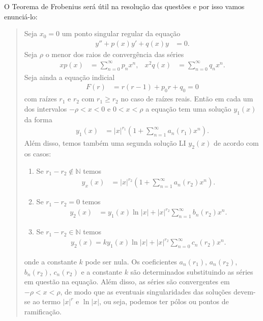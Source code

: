 \documentclass[a4paper,12pt, leqno, answers]{exam}
\begin{document}
\thispagestyle{empty}

\newpage
\setcounter{page}{1}
O Teorema de Frobenius ser\'{a} útil na resolu\c{c}\~{a}o das quest\~{o}es e por isso vamos enunci\'{a}-lo:
\begin{quote}
    Seja $x_0 = 0$ um ponto singular regular da equa\c{c}\~{a}o
    \begin{align*}
        y'' + p(x) y' + q(x) y &= 0.
    \end{align*}
    Seja $\rho$ o menor dos raios de converg\^{e}ncia das s\'{e}ries
    \begin{align*}
        x p(x) &= \sum_{n = 0}^\infty p_n x^n, & x^2 q(x) &= \sum_{n = 0}^\infty q_n x^n.
    \end{align*}
    Seja ainda a equa\c{c}\~{a}o indicial
    \begin{align*}
        F(r) &= r \left( r - 1 \right) + p_0 r + q_0 = 0
    \end{align*}
    com ra\'{i}zes $r_1$ e $r_2$ com $r_1 \geq r_2$ no caso de ra\'{i}zes reais. Ent\~{a}o em cada um dos intervalos $-\rho < x < 0$ e $0 < x < \rho$ a equa\c{c}\~{a}o tem uma solu\c{c}\~{a}o $y_1(x)$ da forma
    \begin{align*}
        y_1(x) &= |x|^{r_1} \left( 1 + \sum_{n = 1}^\infty a_n(r_1) x^n \right).
    \end{align*}
    Al\'{e}m disso, temos tamb\'{e}m uma segunda solu\c{c}\~{a}o LI $y_2(x)$ de acordo com os casos:
    \begin{enumerate}
        \item Se $r_1 - r_2 \not\in \mathbb{N}$ temos
            \begin{align*}
                y_x(x) &= |x|^{r_2} \left( 1 + \sum_{n = 1}^\infty a_n(r_2) x^n \right).
            \end{align*}
        \item Se $r_1 - r_2 = 0$ temos
            \begin{align*}
                y_2(x) &= y_1(x) \ln |x| + |x|^{r_2} \sum_{n = 1}^\infty b_n(r_2) x^n.
            \end{align*}
        \item Se $r_1 - r_2 \in \mathbb{N}$ temos
            \begin{align*}
                y_2(x) = k y_1(x) \ln |x| + |x|^{r_2} \sum_{n = 0}^\infty c_n(r_2) x^n.
            \end{align*}
    \end{enumerate}
    onde a constante $k$ pode ser nula. Os coeficientes $a_n(r_1)$, $a_n(r_2)$, $b_n(r_2)$, $c_n(r_2)$ e a constante $k$ s\~{a}o determinados substituindo as s\'{e}ries em quest\~{a}o na equa\c{c}\~{a}o. Al\'{e}m disso, as s\'{e}ries s\~{a}o convergentes em $-\rho < x < \rho$, de modo que as eventuais singularidades das solu\c{c}\~{o}es devem-se ao termo $|x|^r$ e $\ln |x|$, ou seja, podemos ter p\'{o}los ou pontos de ramifica\c{c}\~{a}o.
\end{quote}
\end{document}

